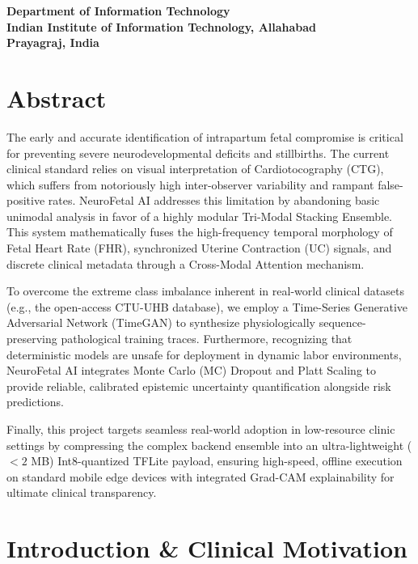 \documentclass[12pt,a4paper]{report}
\begin{document}
\vspace{1cm}
\begin{flushleft}
\textbf{Department of Information Technology} \\
\textbf{Indian Institute of Information Technology, Allahabad} \\
\textbf{Prayagraj, India}
\end{flushleft}
\clearpage

\chapter*{Abstract}
The early and accurate identification of intrapartum fetal compromise is critical for preventing severe neurodevelopmental deficits and stillbirths. The current clinical standard relies on visual interpretation of Cardiotocography (CTG), which suffers from notoriously high inter-observer variability and rampant false-positive rates. NeuroFetal AI addresses this limitation by abandoning basic unimodal analysis in favor of a highly modular Tri-Modal Stacking Ensemble. This system mathematically fuses the high-frequency temporal morphology of Fetal Heart Rate (FHR), synchronized Uterine Contraction (UC) signals, and discrete clinical metadata through a Cross-Modal Attention mechanism. 

To overcome the extreme class imbalance inherent in real-world clinical datasets (e.g., the open-access CTU-UHB database), we employ a Time-Series Generative Adversarial Network (TimeGAN) to synthesize physiologically sequence-preserving pathological training traces. Furthermore, recognizing that deterministic models are unsafe for deployment in dynamic labor environments, NeuroFetal AI integrates Monte Carlo (MC) Dropout and Platt Scaling to provide reliable, calibrated epistemic uncertainty quantification alongside risk predictions. 

Finally, this project targets seamless real-world adoption in low-resource clinic settings by compressing the complex backend ensemble into an ultra-lightweight ($<2$ MB) Int8-quantized TFLite payload, ensuring high-speed, offline execution on standard mobile edge devices with integrated Grad-CAM explainability for ultimate clinical transparency.
\clearpage

\tableofcontents
\clearpage
{}

\chapter{Introduction \& Clinical Motivation}
\end{document}
